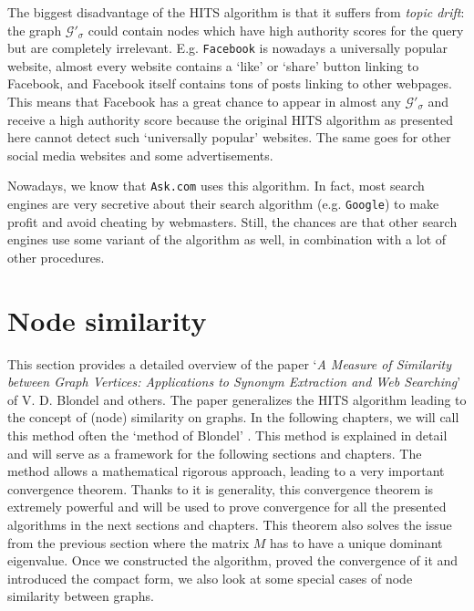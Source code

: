 \documentclass[a4paper,11pt]{report}
\newcommand{\graf}{\mathscr{G}}
\begin{document}
The biggest 
disadvantage of the HITS algorithm is that it suffers from \emph{topic drift}: 
the graph $\graf'_\sigma$ could contain nodes which have high authority scores 
for the query but are completely irrelevant.  E.g. \texttt{Facebook} is nowadays a universally popular website, 
almost every website 
 contains a `like' or `share' button linking to Facebook, and Facebook itself contains tons of posts
 linking to other webpages. This means that Facebook has a great chance to appear in almost any
  $\graf'_\sigma$ and receive a high
 authority score because the original HITS algorithm as presented here cannot detect such `universally popular' websites.  The same goes for other social media websites and some advertisements.

Nowadays, we know that \texttt{Ask.com} uses this algorithm. In fact, most search engines are 
very secretive about their search algorithm (e.g. \texttt{Google}) to make profit and avoid cheating by webmasters. Still, the chances 
are that other search engines use some variant of the algorithm as well, in 
combination with a lot of other procedures. 
\newpage
\section{Node similarity}\label{sectionnodesim}
This section provides a detailed overview of the paper `\emph{A Measure of Similarity between Graph Vertices: 
Applications to Synonym Extraction and Web Searching}' \cite{blondel} of V. D. Blondel and others. 
The paper generalizes the HITS algorithm leading to the concept of (node) similarity on  
graphs. In the following chapters, we will call this method often the `method of Blondel' . This method is explained in detail and will serve as a framework for the following sections and chapters. The method allows
a mathematical rigorous approach, leading to a very important convergence theorem. Thanks to it is generality, this convergence theorem is extremely powerful
and will be used
to prove convergence for all the presented algorithms in the next sections and chapters.  This theorem also solves 
the issue from the previous section where the matrix $M$ has to have a unique dominant
eigenvalue. Once we constructed the algorithm, proved the convergence of it and 
introduced the compact form, we also look at some special cases of node similarity 
between graphs.
\end{document}
